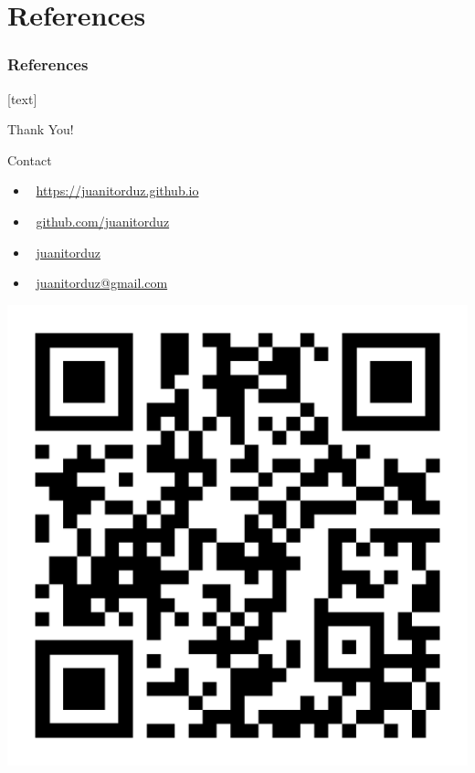 \documentclass[10pt]{beamer}
\begin{document}
\section{References}

\begin{frame}[t, allowframebreaks]
\frametitle{References}
\footnotesize{
[text]

 
}
\end{frame}

\begin{frame}
\begin{center}
\huge{Thank You!}
\end{center}

\begin{block}{Contact}
\begin{itemize}
\item \faRocket $\:$ \href{https://juanitorduz.github.io}{https://juanitorduz.github.io}
\item \faGithub $\:$ \href{https://github.com/juanitorduz}{github.com/juanitorduz}
\item \faTwitter $\:$ \href{https://twitter.com/juanitorduz}{juanitorduz}
\item \faEnvelope $\:$ \href{mailto:juanitorduz@gmail.com}{juanitorduz@gmail.com}
\end{itemize}
\end{block}

\begin{center}
\includegraphics[scale=0.08]{images/qr-code-juanitorduz.png} 
\end{center}

\end{frame}
\end{document}
